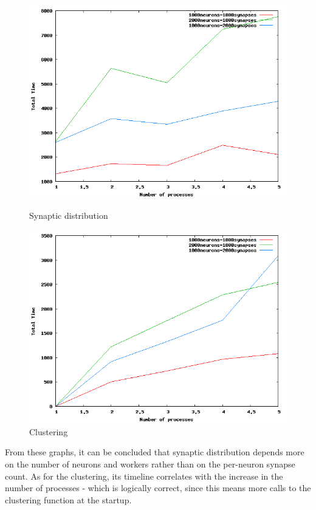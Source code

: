 \begin{figure}[ht]
\begin{minipage}[b]{0.5\linewidth}
\centering
\includegraphics[width=\textwidth]{images/syndistr.png}
\caption{Synaptic distribution}
\label{fig:figure1}
\end{minipage}
\hspace{0.5cm}
\begin{minipage}[b]{0.5\linewidth}
\centering
\includegraphics[width=\textwidth]{images/cluster.png}
\caption{Clustering}
\label{fig:figure2}
\end{minipage}
\end{figure}

From these graphs, it can be concluded that synaptic distribution depends more on the number of neurons and workers rather than on the per-neuron synapse count. As for the clustering, its timeline correlates with the increase in the number of processes - which is logically correct, since this means more calls to the clustering function at the startup.

